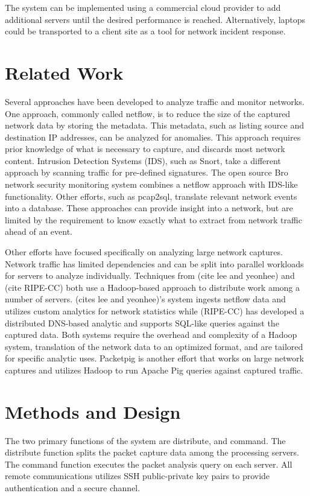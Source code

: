 \documentclass{article}
\begin{document}
\begin{multicols}{2}
The system can be implemented using a commercial cloud provider to add additional servers until the desired performance is reached. Alternatively, laptops could be transported to a client site as a tool for network incident response.

\section*{Related Work}

Several approaches have been developed to analyze traffic and monitor networks. One approach, commonly called netflow, is to reduce the size of the captured network data by storing the metadata. This metadata, such as listing source and destination IP addresses, can be analyzed for anomalies.  This approach requires prior knowledge of what is necessary to capture, and discards most network content. Intrusion Detection Systems (IDS), such as Snort, take a different approach by scanning traffic for pre-defined signatures. The open source Bro network security monitoring system combines a netflow approach with IDS-like functionality.  Other efforts, such as pcap2sql, translate relevant network events into a database. These approaches can provide insight into a network, but are limited by the requirement to know exactly what to extract from network traffic ahead of an event. 

Other efforts have focused specifically on analyzing large network captures. Network traffic has limited dependencies and can be split into parallel workloads for servers to analyze individually.  Techniques from (cite lee and yeonhee) and (cite RIPE-CC) both use a Hadoop-based approach to distribute work among a number of servers.  (cites lee and yeonhee)'s system ingests netflow data and utilizes custom analytics for network statistics while (RIPE-CC) has developed a distributed DNS-based analytic and supports SQL-like queries against the captured data.  Both systems require the overhead and complexity of a Hadoop system, translation of the network data to an optimized format, and are tailored for specific analytic uses.  Packetpig is another effort that works on large network captures and utilizes Hadoop to run Apache Pig queries against captured traffic. 

\section*{Methods and Design}

The two primary functions of the system are distribute, and command. The distribute function splits the packet capture data among the processing servers. The command function executes the packet analysis query on each server.  All remote communications utilizes SSH public-private key pairs to provide authentication and a secure channel.  


\end{multicols}
\end{document}
